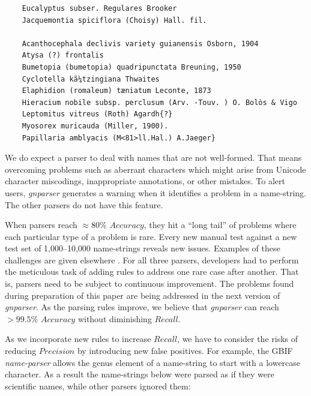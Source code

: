 \documentclass{bmcart}
\makeatletter
\newcommand{\verbatimfont}[1]{\def\verbatim@font{#1}}%
\makeatother
\begin{document}
\vspace{0.5cm}

\verbatimfont{\bfseries\rmfamily\small}

\begin{verbatim}
    Eucalyptus subser. Regulares Brooker
    Jacquemontia spiciflora (Choisy) Hall. fil.

    Acanthocephala declivis variety guianensis Osborn, 1904
    Atysa (?) frontalis
    Bumetopia (bumetopia) quadripunctata Breuning, 1950
    Cyclotella kã¼tzingiana Thwaites
    Elaphidion (romaleum) tæniatum Leconte, 1873
    Hieracium nobile subsp. perclusum (Arv. -Touv. ) O. Bolòs & Vigo
    Leptomitus vitreus (Roth) Agardh{?}
    Myosorex muricauda (Miller, 1900).
    Papillaria amblyacis (M<81>ll.Hal.) A.Jaeger}
\end{verbatim}

\vspace{0.5cm}

We do expect a parser to deal with names that are not well-formed. That means overcoming problems such as aberrant characters which might arise from Unicode character miscodings, inappropriate annotations, or other mistakes. To alert users, \textit{gnparser} generates a warning when it identifies a problem in a name-string. The other parsers do not have this feature.

When parsers reach $\approx80\%$ $Accuracy$, they hit a ``long tail'' of problems where each particular type of a problem is rare. Every new manual test against a new test set of 1,000--10,000 name-strings reveals new issues.  Examples of these challenges are given elsewhere \cite{Patterson2016}.  For all three parsers, developers had to perform the meticulous task of adding rules to address one rare case after another. That is, parsers need to be subject to continuous improvement. The problems found during preparation of this paper are being addressed in the next version of \textit{gnparser}. As the parsing rules improve, we believe that \textit{gnparser} can reach $>99.5\%$ $Accuracy$ without diminishing $Recall$.

As we incorporate new rules to increase $Recall$, we have to consider the risks of reducing $Precision$ by introducing new false positives. For example, the GBIF \textit{name-parser} allows the genus element of a name-string to start with a lowercase character. As a result the name-strings below were parsed as if they were scientific names, while other parsers ignored them:

\vspace{0.5cm}
\end{document}
